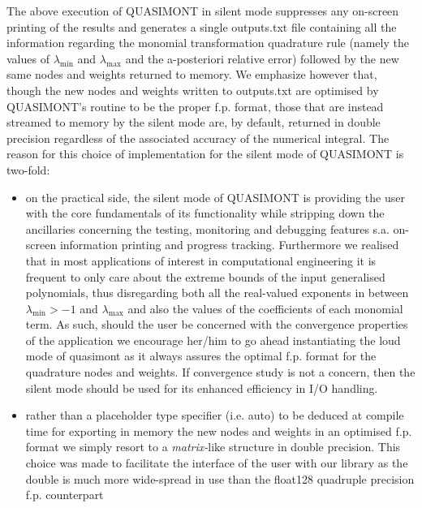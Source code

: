 \documentclass[a4paper, twosided]{book}
\begin{document}
\vspace{0.2cm}
\vspace{0.3cm}

\noindent
The above execution of QUASIMONT in silent mode suppresses any on-screen printing of the results and generates a single \colorbox{poliGrayBlue}{outputs.txt} file containing all the information regarding the monomial transformation quadrature rule (namely the values of $\lambda_{\text{min}}$ and $\lambda_{\text{max}}$ and the a-posteriori relative error) followed by the new same nodes and weights returned to memory. We emphasize however that, though the new nodes and weights written to \colorbox{poliGrayBlue}{outputs.txt} are optimised by QUASIMONT's routine to be the proper f.p. format, those that are instead streamed to memory by the silent mode are, by default, returned in \colorbox{poliGrayBlue}{double} precision regardless of the associated accuracy of the numerical integral. The reason for this choice of implementation for the silent mode of QUASIMONT is two-fold:
\begin{itemize}
    \item on the practical side, the silent mode of QUASIMONT is providing the user with the core fundamentals of its functionality while stripping down the ancillaries concerning the testing, monitoring and debugging features s.a. on-screen information printing and progress tracking. Furthermore we realised that in most applications of interest in computational engineering it is frequent to only care about the extreme bounds of the input generalised polynomials, thus disregarding both all the real-valued exponents in between $\lambda_{\text{min}}>-1$ and $\lambda_{\text{max}}$ and also the values of the coefficients of each monomial term. As such, should the user be concerned with the convergence properties of the application we encourage her/him to go ahead instantiating the loud mode of \colorbox{poliGrayBlue}{quasimont} as it always assures the optimal f.p. format for the quadrature nodes and weights. If convergence study is not a concern, then the silent mode should be used for its enhanced efficiency in I/O handling.
    \item rather than a placeholder type specifier (i.e. \colorbox{poliGrayBlue}{auto}) to be deduced at compile time for exporting in memory the new nodes and weights in an optimised f.p. format we simply resort to a {\itshape matrix-}like structure in \colorbox{poliGrayBlue}{double} precision. This choice was made to facilitate the interface of the user with our library as the \colorbox{poliGrayBlue}{double} is much more wide-spread in use than the \colorbox{poliGrayBlue}{float128} quadruple precision f.p. counterpart 
\end{itemize}
\end{document}
